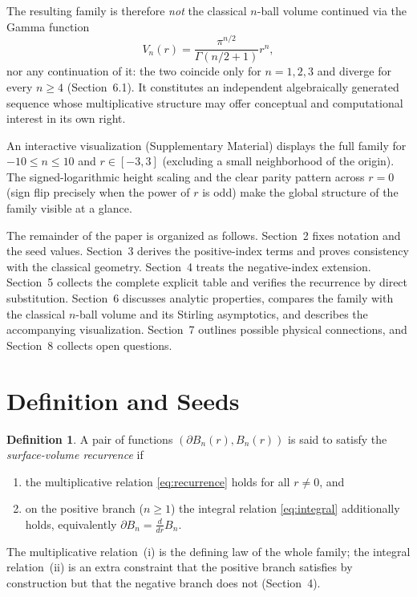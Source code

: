 \documentclass[11pt,a4paper]{article}
\theoremstyle{definition}
\newtheorem{definition}[theorem]{Definition}
\begin{document}
The resulting family is therefore \emph{not} the classical \(n\)-ball volume continued via the Gamma function
\[
V_n(r) = \frac{\pi^{n/2}}{\Gamma(n/2+1)} r^n,
\]
nor any continuation of it: the two coincide only for \(n=1,2,3\) and diverge for every \(n\geq 4\) (Section~6.1). It constitutes an independent algebraically generated sequence whose multiplicative structure may offer conceptual and computational interest in its own right.

An interactive visualization (Supplementary Material) displays the full family for \(-10\leq n\leq 10\) and \(r\in[-3,3]\) (excluding a small neighborhood of the origin). The signed-logarithmic height scaling and the clear parity pattern across \(r=0\) (sign flip precisely when the power of \(r\) is odd) make the global structure of the family visible at a glance.

The remainder of the paper is organized as follows. Section~2 fixes notation and the seed values. Section~3 derives the positive-index terms and proves consistency with the classical geometry. Section~4 treats the negative-index extension. Section~5 collects the complete explicit table and verifies the recurrence by direct substitution. Section~6 discusses analytic properties, compares the family with the classical \(n\)-ball volume and its Stirling asymptotics, and describes the accompanying visualization. Section~7 outlines possible physical connections, and Section~8 collects open questions.

\section{Definition and Seeds}

\begin{definition}
A pair of functions \((\partial B_n(r), B_n(r))\) is said to satisfy the \emph{surface-volume recurrence} if
\begin{enumerate}[label=(\roman*)]
\item the multiplicative relation \eqref{eq:recurrence} holds for all \(r\neq 0\), and
\item on the positive branch (\(n\ge 1\)) the integral relation \eqref{eq:integral} additionally holds, equivalently \(\partial B_n = \tfrac{d}{dr}B_n\).
\end{enumerate}
The multiplicative relation~(i) is the defining law of the whole family; the integral relation~(ii) is an extra constraint that the positive branch satisfies by construction but that the negative branch does not (Section~4).
\end{definition}
\end{document}
